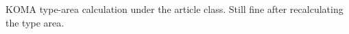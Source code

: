 \documentclass{article}
\begin{document}
KOMA type-area calculation under the article class.
\recalctypearea
Still fine after recalculating the type area.
\end{document}
